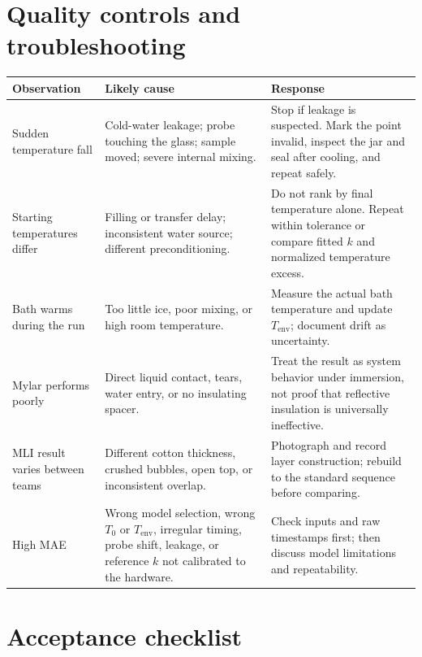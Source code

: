 \documentclass[11pt,a4paper]{article}
\begin{document}
\section{Quality controls and troubleshooting}

\begin{tabularx}{\textwidth}{p{}Yp{0.29\textwidth}}
\toprule
\textbf{Observation} & \textbf{Likely cause} & \textbf{Response} \\
\midrule
Sudden temperature fall & Cold-water leakage; probe touching the glass; sample moved; severe internal mixing. & Stop if leakage is suspected. Mark the point invalid, inspect the jar and seal after cooling, and repeat safely. \\
Starting temperatures differ & Filling or transfer delay; inconsistent water source; different preconditioning. & Do not rank by final temperature alone. Repeat within tolerance or compare fitted $k$ and normalized temperature excess. \\
Bath warms during the run & Too little ice, poor mixing, or high room temperature. & Measure the actual bath temperature and update $T_{\mathrm{env}}$; document drift as uncertainty. \\
Mylar performs poorly & Direct liquid contact, tears, water entry, or no insulating spacer. & Treat the result as system behavior under immersion, not proof that reflective insulation is universally ineffective. \\
MLI result varies between teams & Different cotton thickness, crushed bubbles, open top, or inconsistent overlap. & Photograph and record layer construction; rebuild to the standard sequence before comparing. \\
High MAE & Wrong model selection, wrong $T_0$ or $T_{\mathrm{env}}$, irregular timing, probe shift, leakage, or reference $k$ not calibrated to the hardware. & Check inputs and raw timestamps first; then discuss model limitations and repeatability. \\
\bottomrule
\end{tabularx}

\section{Acceptance checklist}
\end{document}
